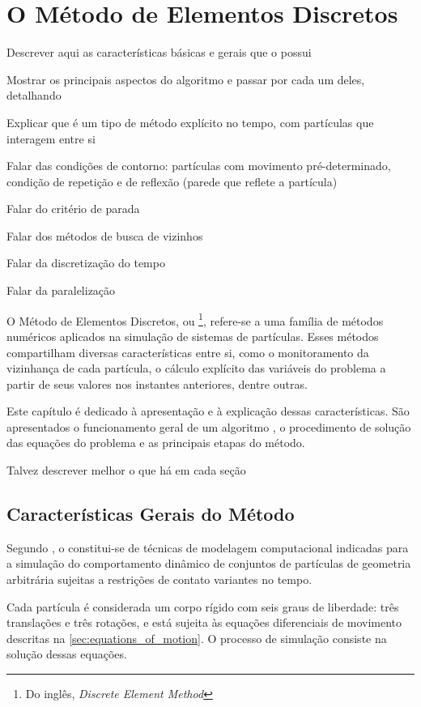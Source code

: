 \chapter{O Método de Elementos Discretos} \label{ch:discrete_element_method}

\alert{Descrever aqui as características básicas e gerais que o \DEM{} possui}

\alert{Mostrar os principais aspectos do algoritmo e passar por cada um deles, detalhando}

\alert{Explicar que é um tipo de método explícito no tempo, com partículas que interagem entre si}

\alert{Falar das condições de contorno: partículas com movimento pré-determinado, condição de repetição e de reflexão (parede que reflete a partícula)}

\alert{Falar do critério de parada}

\alert{Falar dos métodos de busca de vizinhos}

\alert{Falar da discretização do tempo}

\alert{Falar da paralelização}

O Método de Elementos Discretos, ou \DEM{}\footnote{Do inglês, \textit{Discrete Element Method}}, refere-se a uma família de métodos numéricos aplicados na simulação de sistemas de partículas. Esses métodos compartilham diversas características entre si, como o monitoramento da vizinhança de cada partícula, o cálculo explícito das variáveis do problema a partir de seus valores nos instantes anteriores, dentre outras.

Este capítulo é dedicado à apresentação e à explicação dessas características. São apresentados o funcionamento geral de um algoritmo \DEM{}, o procedimento de solução das equações do problema e as principais etapas do método.

\alert{Talvez descrever melhor o que há em cada seção}

\section{Características Gerais do Método}

Segundo , o \DEM{} constitui-se de técnicas de modelagem computacional indicadas para a simulação do comportamento dinâmico de conjuntos de partículas de geometria arbitrária sujeitas a restrições de contato variantes no tempo.

Cada partícula é considerada um corpo rígido com seis graus de liberdade: três translações e três rotações, e está sujeita às equações diferenciais de movimento descritas na \autoref{sec:equations_of_motion}. O processo de simulação consiste na solução dessas equações.

